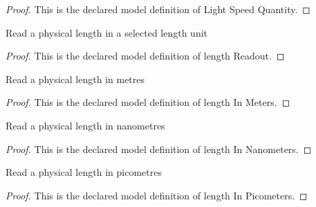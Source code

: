 \begin{proof}
  This is the declared model definition of Light Speed Quantity.
\end{proof}
\begin{definition}
  \label{def:physics:phyx-mini-0587:phyxminiproblems-problemphyxmini0587-lengthreadout}
  Read a physical length in a selected length unit
\end{definition}
\begin{proof}
  This is the declared model definition of length Readout.
\end{proof}
\begin{definition}
  \label{def:physics:phyx-mini-0587:phyxminiproblems-problemphyxmini0587-lengthinmeters}
  Read a physical length in metres
\end{definition}
\begin{proof}
  This is the declared model definition of length In Meters.
\end{proof}
\begin{definition}
  \label{def:physics:phyx-mini-0587:phyxminiproblems-problemphyxmini0587-lengthinnanometers}
  Read a physical length in nanometres
\end{definition}
\begin{proof}
  This is the declared model definition of length In Nanometers.
\end{proof}
\begin{definition}
  \label{def:physics:phyx-mini-0587:phyxminiproblems-problemphyxmini0587-lengthinpicometers}
  Read a physical length in picometres
\end{definition}
\begin{proof}
  This is the declared model definition of length In Picometers.
\end{proof}
